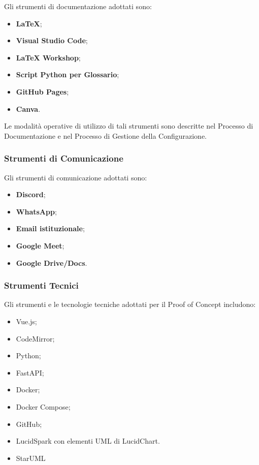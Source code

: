 Gli strumenti di documentazione adottati sono:

\begin{itemize}
    \item \textbf{\LaTeX{}};
    \item \textbf{Visual Studio Code};
    \item \textbf{LaTeX Workshop};
    \item \textbf{Script Python per Glossario};
    \item \textbf{GitHub Pages};
    \item \textbf{Canva}.
\end{itemize}

Le modalità operative di utilizzo di tali strumenti sono descritte nel Processo
di Documentazione e nel Processo di Gestione della Configurazione.


\subsubsection{Strumenti di Comunicazione}

Gli strumenti di comunicazione adottati sono:

\begin{itemize}
    \item \textbf{Discord};
    \item \textbf{WhatsApp};
    \item \textbf{Email istituzionale};
    \item \textbf{Google Meet};
    \item \textbf{Google Drive/Docs}.
\end{itemize}


\subsubsection{Strumenti Tecnici}

Gli strumenti e le tecnologie tecniche adottati per il Proof of Concept includono:

\begin{itemize}
    \item Vue.js;
    \item CodeMirror;
    \item Python;
    \item FastAPI;
    \item Docker;
    \item Docker Compose;
    \item GitHub;
    \item LucidSpark con elementi UML di LucidChart.
    \item StarUML
\end{itemize}

